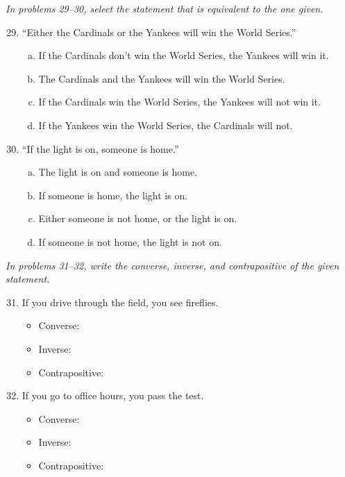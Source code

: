 \emph{In problems 29--30, select the statement that is equivalent to the one given.}
\begin{enumerate}
\setcounter{enumi}{28}

\item ``Either the Cardinals or the Yankees will win the World Series.'' 
\begin{enumerate}[(a)]
\item If the Cardinals don't win the World Series, the Yankees will win it.
\item The Cardinals and the Yankees will win the World Series.
\item If the Cardinals win the World Series, the Yankees will not win it.
\item If the Yankees win the World Series, the Cardinals will not.
\end{enumerate}

\item ``If the light is on, someone is home.'' 
\begin{enumerate}[(a)]
\item The light is on and someone is home.
\item If someone is home, the light is on.
\item Either someone is not home, or the light is on.
\item If someone is not home, the light is not on.
\end{enumerate}
\end{enumerate}

\emph{In problems 31--32, write the converse, inverse, and contrapositive of the given statement.}
\begin{enumerate}
\setcounter{enumi}{30}

\item If you drive through the field, you see fireflies.
\begin{itemize}
\item Converse: 
\item Inverse: 
\item Contrapositive: 
\end{itemize}

\item If you go to office hours, you pass the test.
\begin{itemize}
\item Converse: 
\item Inverse: 
\item Contrapositive: 
\end{itemize}
\end{enumerate}